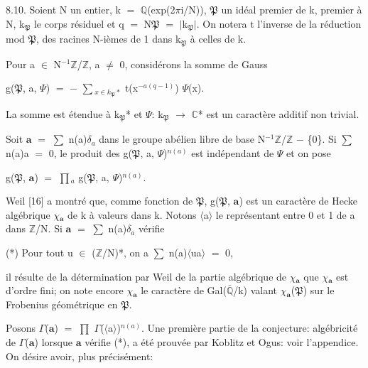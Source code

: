 \documentclass[10pt,twoside]{article}
\begin{document}
8.10. Soient N un entier, k \ensuremath{=} \ensuremath{ℚ}(exp(2\ensuremath{π}i/N)), \ensuremath{𝔓} un idéal premier de k, premier à N, k\ensuremath{_{𝔓}} le corps résiduel et q \ensuremath{=} N\ensuremath{𝔓} \ensuremath{=} \ensuremath{|}k\ensuremath{_{𝔓}}\ensuremath{|}. On notera t l’inverse de la réduction mod \ensuremath{𝔓}, des racines N-ièmes de 1 dans k\ensuremath{_{𝔓}} à celles de k.\par
Pour a \ensuremath{∈} N\ensuremath{^{-1}}\ensuremath{ℤ}/\ensuremath{ℤ}, a \ensuremath{≠} 0, considérons la somme de Gauss\par
g(\ensuremath{𝔓}, a, \ensuremath{Ψ}) \ensuremath{=} \ensuremath{−} \ensuremath{∑}\ensuremath{_{x∈k_𝔓*}} t(x\ensuremath{^{−a(q−1)}}) \ensuremath{Ψ}(x).\par
La somme est étendue à k\ensuremath{_{𝔓}}* et \ensuremath{Ψ}: k\ensuremath{_{𝔓}} \ensuremath{→} \ensuremath{ℂ}* est un caractère additif non trivial.\par
Soit \ensuremath{𝐚} \ensuremath{=} \ensuremath{∑} n(a)\ensuremath{δ}\ensuremath{_{a}} dans le groupe abélien libre de base N\ensuremath{^{-1}}\ensuremath{ℤ}/\ensuremath{ℤ} \ensuremath{−} \{0\}. Si \ensuremath{∑} n(a)a \ensuremath{=} 0, le produit des g(\ensuremath{𝔓}, a, \ensuremath{Ψ})\ensuremath{^{n(a)}} est indépendant de \ensuremath{Ψ} et on pose\par
g(\ensuremath{𝔓}, \ensuremath{𝐚}) \ensuremath{=} \ensuremath{∏}\ensuremath{_{a}} g(\ensuremath{𝔓}, a, \ensuremath{Ψ})\ensuremath{^{n(a)}}.\par
Weil [16] a montré que, comme fonction de \ensuremath{𝔓}, g(\ensuremath{𝔓}, \ensuremath{𝐚}) est un caractère de Hecke algébrique \ensuremath{χ}\ensuremath{_{𝐚}} de k à valeurs dans k. Notons \ensuremath{⟨}a\ensuremath{⟩} le représentant entre 0 et 1 de a dans \ensuremath{ℤ}/N. Si \ensuremath{𝐚} \ensuremath{=} \ensuremath{∑} n(a)\ensuremath{δ}\ensuremath{_{a}} vérifie\par
(*)    Pour tout u \ensuremath{∈} (\ensuremath{ℤ}/N)*, on a \ensuremath{∑} n(a)\ensuremath{⟨}ua\ensuremath{⟩} \ensuremath{=} 0,\par
il résulte de la détermination par Weil de la partie algébrique de \ensuremath{χ}\ensuremath{_{𝐚}} que \ensuremath{χ}\ensuremath{_{𝐚}} est d’ordre fini; on note encore \ensuremath{χ}\ensuremath{_{𝐚}} le caractère de Gal(\ensuremath{\bar{ℚ}}/k) valant \ensuremath{χ}\ensuremath{_{𝐚}}(\ensuremath{𝔓}) sur le Frobenius géométrique en \ensuremath{𝔓}.\par
Posons \ensuremath{Γ}(\ensuremath{𝐚}) \ensuremath{=} \ensuremath{∏} \ensuremath{Γ}(\ensuremath{⟨}a\ensuremath{⟩})\ensuremath{^{n(a)}}. Une première partie de la conjecture: algébricité de \ensuremath{Γ}(\ensuremath{𝐚}) lorsque \ensuremath{𝐚} vérifie (*), a été prouvée par Koblitz et Ogus: voir l’appendice. On désire avoir, plus précisément:\par
\end{document}
